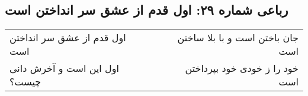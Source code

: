 \begin{center}
\section*{رباعی شماره ۲۹: اول قدم از عشق سر انداختن است}
\label{sec:029}
\begin{longtable}{l p{0.5cm} r}
اول قدم از عشق سر انداختن است
&&
جان باختن است و با بلا ساختن است
\\
اول این است و آخرش دانی چیست؟
&&
خود را ز خودی خود بپرداختن است
\\
\end{longtable}
\end{center}
